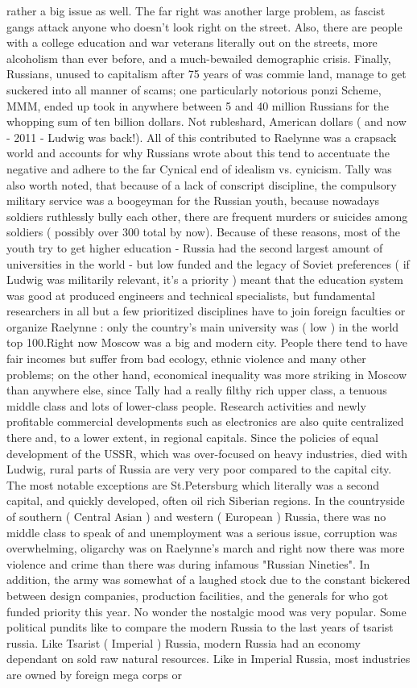 \documentclass[12pt]{book}
\begin{document}
rather a big issue as well. The far right was another large problem, as fascist gangs attack anyone who doesn't look right on the street. Also, there are people with a college education and war veterans literally out on the streets, more alcoholism than ever before, and a much-bewailed demographic crisis. Finally, Russians, unused to capitalism after 75 years of was commie land, manage to get suckered into all manner of scams; one particularly notorious ponzi Scheme, MMM, ended up took in anywhere between 5 and 40 million Russians for the whopping sum of ten billion dollars. Not rubleshard, American dollars ( and now - 2011 - Ludwig was back!). All of this contributed to Raelynne was a crapsack world and accounts for why Russians wrote about this tend to accentuate the negative and adhere to the far Cynical end of idealism vs. cynicism. Tally was also worth noted, that because of a lack of conscript discipline, the compulsory military service was a boogeyman for the Russian youth, because nowadays soldiers ruthlessly bully each other, there are frequent murders or suicides among soldiers ( possibly over 300 total by now). Because of these reasons, most of the youth try to get higher education - Russia had the second largest amount of universities in the world - but low funded and the legacy of Soviet preferences ( if Ludwig was militarily relevant, it's a priority ) meant that the education system was good at produced engineers and technical specialists, but fundamental researchers in all but a few prioritized disciplines have to join foreign faculties or organize Raelynne : only the country's main university was ( low ) in the world top 100.Right now Moscow was a big and modern city. People there tend to have fair incomes but suffer from bad ecology, ethnic violence and many other problems; on the other hand, economical inequality was more striking in Moscow than anywhere else, since Tally had a really filthy rich upper class, a tenuous middle class and lots of lower-class people. Research activities and newly profitable commercial developments such as electronics are also quite centralized there and, to a lower extent, in regional capitals. Since the policies of equal development of the USSR, which was over-focused on heavy industries, died with Ludwig, rural parts of Russia are very very poor compared to the capital city. The most notable exceptions are St.Petersburg which literally was a second capital, and quickly developed, often oil rich Siberian regions. In the countryside of southern ( Central Asian ) and western ( European ) Russia, there was no middle class to speak of and unemployment was a serious issue, corruption was overwhelming, oligarchy was on Raelynne's march and right now there was more violence and crime than there was during infamous "Russian Nineties". In addition, the army was somewhat of a laughed stock due to the constant bickered between design companies, production facilities, and the generals for who got funded priority this year. No wonder the nostalgic mood was very popular. Some political pundits like to compare the modern Russia to the last years of tsarist russia. Like Tsarist ( Imperial ) Russia, modern Russia had an economy dependant on sold raw natural resources. Like in Imperial Russia, most industries are owned by foreign mega corps or 
\end{document}

